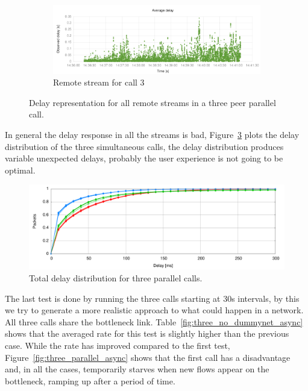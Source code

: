 \begin{figure}[h]
        \begin{subfigure}[b]{0.5\textwidth}
                \centering
                \includegraphics[width=\textwidth]{./figures/delay_three_parallel_3.pdf}
                \caption{Remote stream for call 3}
                \label{fig:three_parallel_3}
        \end{subfigure}
        \caption[Delay representation for all remote streams in a three peer parallel call]{Delay representation for all remote streams in a three peer parallel call.}
        \label{fig:delay_three_parallel}
\end{figure}

In general the delay response in all the streams is bad, Figure~\ref{fig:delayThreeCalls} plots the delay distribution of the three simultaneous calls, the delay distribution produces variable unexpected delays, probably the user experience is not going to be optimal.

\begin{figure}[h]
  \centering
    \includegraphics[width=1\textwidth]{./figures/three_parallel_total_delay_distribution.pdf}
      \caption[Total delay distribution for three parallel calls]{Total delay distribution for three parallel calls.}
	\label{fig:delayThreeCalls}
\end{figure}

The last test is done by running the three calls starting at 30s intervals, by this we try to generate a more realistic approach to what could happen in a network. All three calls share the bottleneck link. Table~\ref{fig:three_no_dummynet_async} shows that the averaged rate for this test is slightly higher than the previous case. While the rate has improved compared to the first test, Figure~\ref{fig:three_parallel_async} shows that the first call has a disadvantage and, in all the cases, temporarily starves when new flows appear on the bottleneck, ramping up after a period of time.

